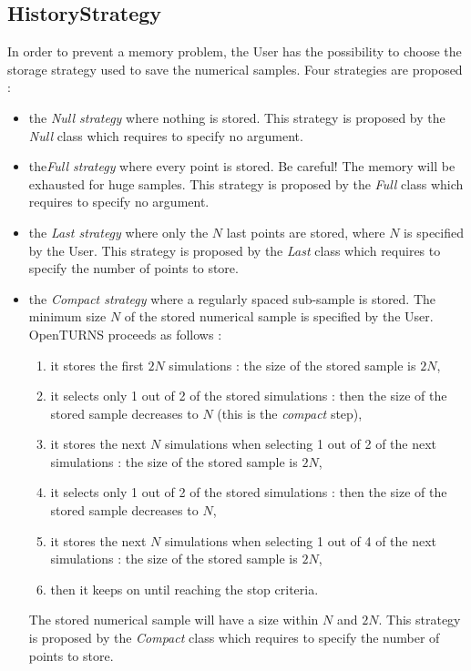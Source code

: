 \newpage
\subsection{HistoryStrategy}



In order to prevent a memory problem, the User has the possibility to choose the storage strategy used to save the numerical samples. Four strategies are proposed :
\begin{itemize}
\item the {\itshape Null strategy} where nothing is stored. This strategy is proposed by the {\itshape Null} class which requires to specify no argument.
\item the{\itshape  Full strategy} where every point is stored. Be careful! The memory will be exhausted for huge samples. This strategy is proposed by the {\itshape Full} class which requires to specify no argument.
\item the {\itshape Last strategy} where only the $N$ last points are stored, where $N$ is specified by the User. This strategy is proposed by the {\itshape Last} class which requires to specify the number of points to store.
\item the {\itshape Compact strategy} where a regularly spaced sub-sample is stored. The minimum size $N$ of the stored numerical sample is specified by the User.  OpenTURNS proceeds as follows :
\begin{enumerate}
\item it stores the first $2N$ simulations : the size of the stored sample is $2N$,
\item it selects only 1 out of 2 of the stored simulations : then the size of the stored sample decreases to $N$ (this is the {\itshape compact} step),
\item it stores the next $N$ simulations when selecting 1 out of 2 of the next simulations : the size of the stored sample is $2N$,
\item it selects only 1 out of 2 of the stored simulations : then the size of the stored sample decreases to $N$,
\item it stores the next $N$ simulations when selecting 1 out of 4 of the next simulations : the size of the stored sample is $2N$,
\item then it keeps on until  reaching the stop criteria.
\end{enumerate}
The stored numerical sample will have a size within $N$ and $2N$. This strategy is proposed by the {\itshape Compact} class which requires to specify the number of points to store.
\end{itemize}




